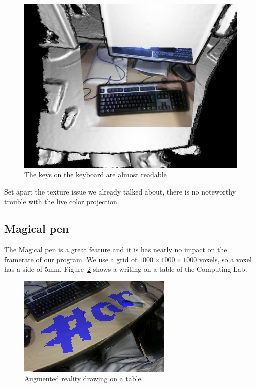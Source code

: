 \documentclass[12pt, twoside]{article}
\begin{document}
\begin{figure}[!h]
  \centering
  \includegraphics[scale=0.3]{Color2.png}
  \caption{\label{fig:color2} The keys on the keyboard are almost readable}
\end{figure}

Set apart the texture issue we already talked about, there is no noteworthy trouble with the live color projection.

\subsection{Magical pen}
The Magical pen is a great feature and it is has nearly no impact on the framerate of our program. We use a grid of $1000\times 1000\times 1000$ voxels, so a voxel has a side of 5mm. Figure~\ref{fig:hashtag} shows a writing on a table of the Computing Lab.

\begin{figure}[!h]
  \centering
  \includegraphics[scale=0.6]{hashtag.png}
  \caption{\label{fig:hashtag} Augmented reality drawing on a table}
\end{figure}
\end{document}
